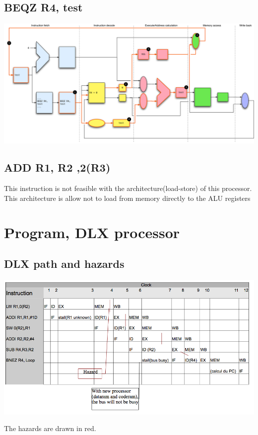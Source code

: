 \documentclass[a4paper,10pt]{article}
\begin{document}
			
		\subsection{BEQZ R4, test}
		\begin{center}
		 			\includegraphics[width=1.1\textwidth]{./images/beqz}
		\end{center}

			
 		\subsection{ADD R1, R2 ,2(R3)}
 			This instruction is not feasible with the architecture(load-store) of this processor. This architecture is allow not to load from 
 			memory directly to the ALU registers 
	\section{ Program,  DLX  processor }
		\subsection{DLX path and hazards }
		\begin{center}
	  		\includegraphics[width=\textwidth]{./images/ex2.png}
		\end{center}
		The hazards are drawn in red.
		
\end{document}
